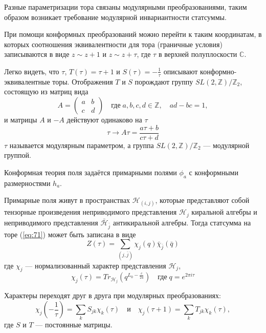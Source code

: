 Разные параметризации тора связаны модулярными преобразованиями, таким образом возникает требование
модулярной инвариантности статсуммы.

При помощи конформных преобразований можно перейти к таким координатам, в которых соотношения
эквивалентности для тора (граничные условия) записываются в виде $z\sim z+1$ и $z\sim z+\tau$, где $\tau$ в верхней полуплоскости
$\mathbb{C}$.

Легко видеть, что $\tau$, $T(\tau)=\tau+1$ и $S(\tau)=-\frac{1}{\tau}$ описывают
конформно-эквивалентные торы. Отображения $T$ и $S$ порождают группу
$SL(2,\mathbb{Z})/\mathbb{Z}_2$, состоящую из матриц вида
\begin{equation}
  \label{eq:99} A=
  \begin{pmatrix} a & b\\ c & d
  \end{pmatrix} \quad\mbox{где}\; a,b,c,d\in\mathbb{Z},\quad ad-bc=1,
\end{equation}
и матрицы $A$ и $-A$ действуют одинаково на $\tau$
\begin{equation}
  \label{eq:137} \tau\to A\tau=\frac{a\tau+b}{c\tau+d}
\end{equation}
$\tau$ называется модулярным параметром, а группа $SL(2,\mathbb{Z})/\mathbb{Z}_2$ ---
модулярной группой.

Конформная теория поля задаётся примарными полями $\phi_a$ с конформными размерностями $h_a$.

Примарные поля живут в пространствах $\mathcal{H}_{(i,j)}$, которые представляют собой тензорные
произведения неприводимого представления $\mathcal{H}_j$ киральной алгебры и неприводимого
представления $\bar{\mathcal{H}}_{\bar{j}}$ антикиральной алгебры. Тогда статсумма на торе
(\ref{eq:71}) может быть записана в виде
\begin{equation}
  \label{eq:9}
    Z(\tau)=\sum_{(j,\bar j)}\chi_j(q)\bar \chi_{\bar j}(\bar q)
\end{equation}
где $\chi_j$ --- нормализованный характер представления $\mathcal{H}_j$,
\begin{equation}
  \label{eq:74}
  \chi_j(\tau)=Tr_{\mathcal{H}_j}(q^{L_0-\frac{c}{24}})\quad \mbox{где}\; q=e^{2\pi i\tau}
\end{equation}

Характеры переходят друг в друга при модулярных преобразованиях:
\begin{equation}
  \label{eq:107} \chi_j\left(-\frac{1}{\tau}\right)=\sum_k S_{jk}\chi_k(\tau)\quad \mbox{и}\quad
\chi_j(\tau+1)=\sum_kT_{jk}\chi_k(\tau),
\end{equation}
где $S$ и $T$ --- постоянные матрицы. 

